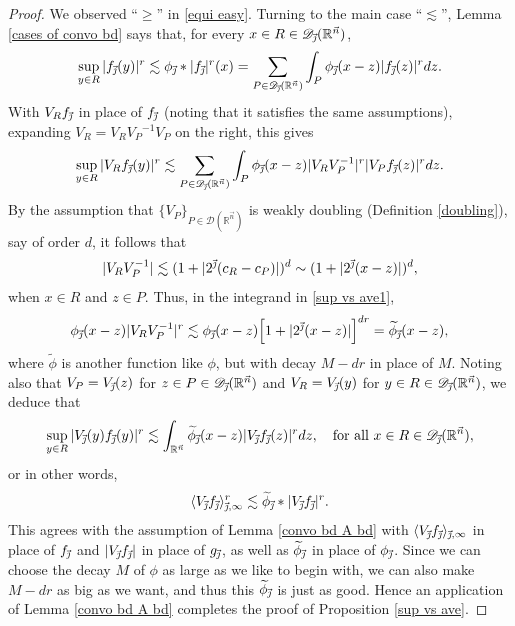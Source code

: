 \documentclass[11pt, reqno]{amsart}
\theoremstyle{definition}
\theoremstyle{remark}
\numberwithin{equation}{section}
\newcommand{\D}{\mathscr D}
\newcommand{\R}{\mathbb R}
\newcommand{\vj}{\vec{\textit{\j}}}
\newcommand{\vn}{\vec n}
\newcommand{\Ave}[3]{\langle#1\rangle_{#2,#3}}
\newcommand{\abs}[1]{|#1|}
\begin{document}
\begin{proof}
We observed ``$\geq$'' in \eqref{equi easy}. Turning to the main case ``$\lesssim$'', Lemma \ref{cases of convo bd} says that,
for every $x\in R\in\D_{\vj}(\R^{\vn})$,
\begin{equation*}
\sup_{y\in R}\abs{f_{\vj}(y)}^r\lesssim\phi_{\vj}*\abs{f_{\vj}}^r(x)
=\sum_{P\in\D_{\vj}(\R^{\vn})}\int_P\phi_{\vj}(x-z)\abs{f_{\vj}(z)}^r dz.
\end{equation*}
With $V_R f_{\vj}$ in place of $f_{\vj}$ (noting that it satisfies the same assumptions), expanding $V_R=V_R {V_P}^{-1}V_P$ on the right, this gives
\begin{equation}\label{sup vs ave1}
\sup_{y\in R}\abs{V_R f_{\vj}(y)}^r\lesssim
\sum_{P\in\D_{\vj}(\R^{\vn})}\int_P\phi_{\vj}(x-z)\abs{V_R V_P^{-1}}^r\abs{V_P f_{\vj}(z)}^r dz.
\end{equation}
By the assumption that $\{V_P\}_{P\in\D(\R^{\vn})}$ is weakly doubling (Definition \ref{doubling}), say of order $d$, it follows that
\begin{equation*}
\abs{V_R V_P^{-1}}\lesssim(1+\abs{2^{\vj}(c_R-c_P)})^d
\sim(1+\abs{2^{\vj}(x-z)})^d,
\end{equation*}
when $x\in R$ and $z\in P$. Thus, in the integrand in \eqref{sup vs ave1},
\begin{equation*}
\phi_{\vj}(x-z)\abs{V_R V_P^{-1}}^r
\lesssim\phi_{\vj}(x-z)\Big[1+\abs{2^{\vj}(x-z)}\Big]^{dr}
=\widetilde{\phi}_{\vj}(x-z),
\end{equation*}
where $\widetilde{\phi}$ is another function like $\phi$, but with decay $M-dr$ in place of $M$.
Noting also that $V_P=V_{\vj}(z)$ for $z\in P\in\D_{\vj}(\R^{\vn})$ and $V_R=V_{\vj}(y)$ for $y\in R\in\D_{\vj}(\R^{\vn})$, we deduce that
\begin{equation*}
\sup_{y\in R}\abs{V_{\vj}(y) f_{\vj}(y)}^r\lesssim\int_{\R^{\vn}}\widetilde{\phi}_{\vj}(x-z)\abs{V_{\vj}f_{\vj}(z)}^r dz,\quad\text{for all }x\in R\in\D_{\vj}(\R^{\vn}),
\end{equation*}
or in other words,
\begin{equation*}
\Ave{V_{\vj}f_{\vj}}{\vj}{\infty}^r
\lesssim \widetilde{\phi}_{\vj}*\abs{V_{\vj}f_{\vj}}^r.
\end{equation*}
This agrees with the assumption of Lemma \ref{convo bd A bd} with $\Ave{ V_{\vj} f_{\vj} }{\vj}{\infty}$ in place of $f_{\vj}$ and $\abs{V_{\vj}f_{\vj}}$ in place of $g_{\vj}$, as well as $\widetilde{\phi}_{\vj}$ in place of $\phi_{\vj}$. Since we can choose the decay $M$ of $\phi$ as large as we like to begin with, we can also make $M-dr$ as big as we want, and thus this $\widetilde{\phi}_{\vj}$ is just as good. Hence an application of Lemma \ref{convo bd A bd} completes the proof of Proposition \ref{sup vs ave}.
\end{proof}
\end{document}
